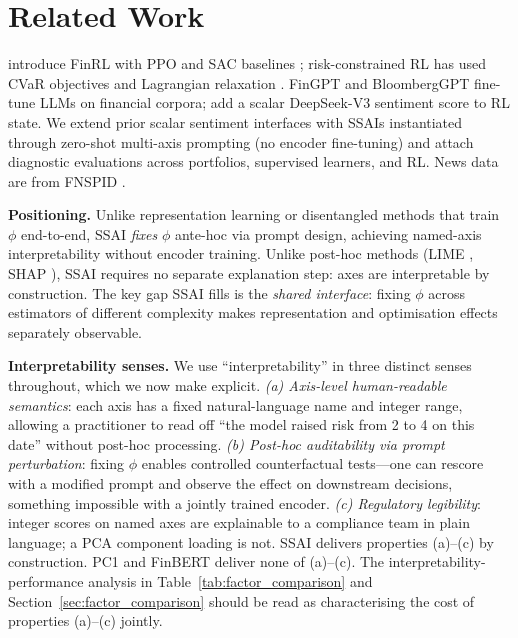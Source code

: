 \documentclass{article}
\begin{document}
\section{Related Work}
\label{sec:related}

\citet{liu2021finrl} introduce FinRL with PPO and SAC baselines \citep{yangfinrl2020,liu2022finrl2}; risk-constrained RL has used CVaR objectives \citep{tamar2015optimizing} and Lagrangian relaxation \citep{ray2019benchmarking}.
FinGPT \citep{liu2023fingpt} and BloombergGPT \citep{wu2023bloomberggpt} fine-tune LLMs on financial corpora; \citet{benstaf2024finrl_deepseek} add a scalar DeepSeek-V3 sentiment score to RL state.
We extend prior scalar sentiment interfaces \citep{benstaf2024finrl_deepseek,chen2023chatgpt} with SSAIs instantiated through zero-shot multi-axis prompting (no encoder fine-tuning) and attach diagnostic evaluations across portfolios, supervised learners, and RL.
News data are from FNSPID \citep{toubia2024fnspid}.

\textbf{Positioning.}
Unlike representation learning \citep{bengio2013representation} or disentangled methods \citep{higgins2017beta} that train $\phi$ end-to-end, SSAI \emph{fixes} $\phi$ ante-hoc via prompt design, achieving named-axis interpretability without encoder training.
Unlike post-hoc methods (LIME \citep{ribeiro2016should}, SHAP \citep{lundberg2017unified}), SSAI requires no separate explanation step: axes are interpretable by construction.
The key gap SSAI fills is the \emph{shared interface}: fixing $\phi$ across estimators of different complexity makes representation and optimisation effects separately observable.

\textbf{Interpretability senses.}
We use ``interpretability'' in three distinct senses throughout, which we now make explicit.
\emph{(a) Axis-level human-readable semantics}: each axis has a fixed natural-language name and integer range, allowing a practitioner to read off ``the model raised risk from 2 to 4 on this date'' without post-hoc processing.
\emph{(b) Post-hoc auditability via prompt perturbation}: fixing $\phi$ enables controlled counterfactual tests---one can rescore with a modified prompt and observe the effect on downstream decisions, something impossible with a jointly trained encoder.
\emph{(c) Regulatory legibility}: integer scores on named axes are explainable to a compliance team in plain language; a PCA component loading is not.
SSAI delivers properties (a)--(c) by construction. PC1 and FinBERT deliver none of (a)--(c). The interpretability-performance analysis in Table~\ref{tab:factor_comparison} and Section~\ref{sec:factor_comparison} should be read as characterising the cost of properties (a)--(c) jointly.
\end{document}
